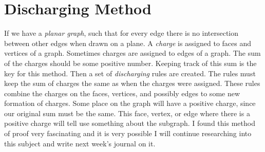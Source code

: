 \documentclass{article}
\begin{document}
\section*{Discharging Method}
If we have a \textit{planar graph}, such that for every edge there is no intersection between other edges when drawn on a plane. A \textit{charge} is assigned to faces and vertices of a graph. Sometimes charges are assigned to edges of a graph. The sum of the charges should be some positive number. Keeping track of this sum is the key for this method. Then a set of \textit{discharging} rules are created. The rules must keep the sum of charges the same as when the charges were assigned. These rules combine the charges on the faces, vertices, and possibly edges to some new formation of charges. Some place on the graph will have a positive charge, since our original sum must be the same. This face, vertex, or edge where there is a positive charge will tell use something about the subgraph. I found this method of proof very fascinating and it is very possible I will continue researching into this subject and write next week's journal on it.
\end{document}
